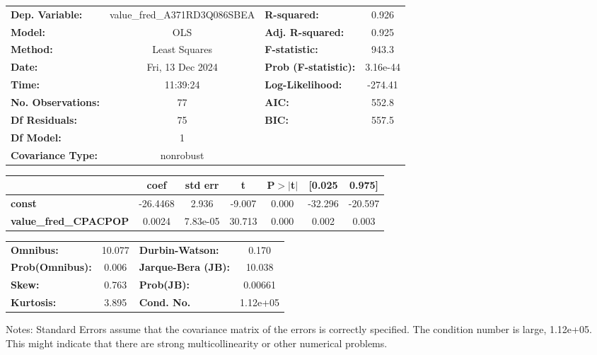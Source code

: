 \begin{center}
\begin{tabular}{lclc}
\toprule
\textbf{Dep. Variable:}       & value\_fred\_A371RD3Q086SBEA & \textbf{  R-squared:         } &     0.926   \\
\textbf{Model:}               &             OLS              & \textbf{  Adj. R-squared:    } &     0.925   \\
\textbf{Method:}              &        Least Squares         & \textbf{  F-statistic:       } &     943.3   \\
\textbf{Date:}                &       Fri, 13 Dec 2024       & \textbf{  Prob (F-statistic):} &  3.16e-44   \\
\textbf{Time:}                &           11:39:24           & \textbf{  Log-Likelihood:    } &   -274.41   \\
\textbf{No. Observations:}    &                77            & \textbf{  AIC:               } &     552.8   \\
\textbf{Df Residuals:}        &                75            & \textbf{  BIC:               } &     557.5   \\
\textbf{Df Model:}            &                 1            & \textbf{                     } &             \\
\textbf{Covariance Type:}     &          nonrobust           & \textbf{                     } &             \\
\bottomrule
\end{tabular}
\begin{tabular}{lcccccc}
                              & \textbf{coef} & \textbf{std err} & \textbf{t} & \textbf{P$> |$t$|$} & \textbf{[0.025} & \textbf{0.975]}  \\
\midrule
\textbf{const}                &     -26.4468  &        2.936     &    -9.007  &         0.000        &      -32.296    &      -20.597     \\
\textbf{value\_fred\_CPACPOP} &       0.0024  &     7.83e-05     &    30.713  &         0.000        &        0.002    &        0.003     \\
\bottomrule
\end{tabular}
\begin{tabular}{lclc}
\textbf{Omnibus:}       & 10.077 & \textbf{  Durbin-Watson:     } &    0.170  \\
\textbf{Prob(Omnibus):} &  0.006 & \textbf{  Jarque-Bera (JB):  } &   10.038  \\
\textbf{Skew:}          &  0.763 & \textbf{  Prob(JB):          } &  0.00661  \\
\textbf{Kurtosis:}      &  3.895 & \textbf{  Cond. No.          } & 1.12e+05  \\
\bottomrule
\end{tabular}
\end{center}

Notes: \newline
 [1] Standard Errors assume that the covariance matrix of the errors is correctly specified. \newline
 [2] The condition number is large, 1.12e+05. This might indicate that there are \newline
 strong multicollinearity or other numerical problems.